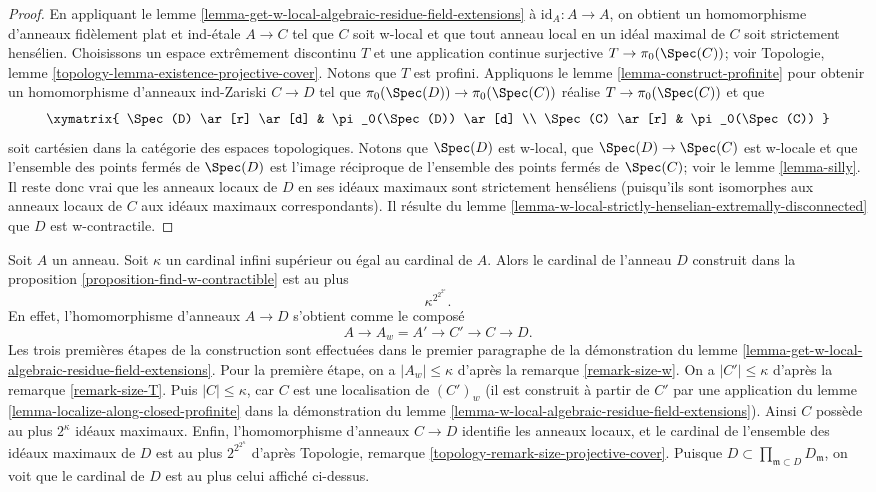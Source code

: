 \begin{proof}
En appliquant le lemme \ref{lemma-get-w-local-algebraic-residue-field-extensions}
à $\text{id}_A : A \to A$, on obtient un homomorphisme d'anneaux fidèlement plat et ind-\'etale
$A \to C$ tel que $C$ soit w-local et que tout anneau local en un
idéal maximal de $C$ soit strictement hensélien.
Choisissons un espace extrêmement discontinu $T$ et une application continue
surjective $T \to \pi_0(\Spec(C))$; voir
Topologie, lemme \ref{topology-lemma-existence-projective-cover}.
Notons que $T$ est profini. Appliquons le lemme \ref{lemma-construct-profinite}
pour obtenir un homomorphisme d'anneaux ind-Zariski $C \to D$ tel que
$\pi_0(\Spec(D)) \to \pi_0(\Spec(C))$ réalise $T \to \pi_0(\Spec(C))$
et que
$$
\xymatrix{
\Spec(D) \ar[r] \ar[d] & \pi_0(\Spec(D)) \ar[d] \\
\Spec(C) \ar[r] & \pi_0(\Spec(C))
}
$$
soit cartésien dans la catégorie des espaces topologiques. Notons que $\Spec(D)$
est w-local, que $\Spec(D) \to \Spec(C)$ est w-locale et que
l'ensemble des points fermés de $\Spec(D)$ est l'image réciproque de
l'ensemble des points fermés de $\Spec(C)$; voir le lemme \ref{lemma-silly}.
Il reste donc vrai que les anneaux locaux de $D$ en ses idéaux
maximaux sont strictement henséliens (puisqu'ils sont isomorphes aux
anneaux locaux de $C$ aux idéaux maximaux correspondants).
Il résulte du
lemme \ref{lemma-w-local-strictly-henselian-extremally-disconnected}
que $D$ est w-contractile.
\end{proof}

\begin{remark}
\label{remark-size-w-contractible}
Soit $A$ un anneau. Soit $\kappa$ un cardinal infini supérieur ou
égal au cardinal de $A$. Alors le cardinal de l'anneau
$D$ construit dans la proposition \ref{proposition-find-w-contractible}
est au plus
$$
\kappa^{2^{2^{2^\kappa}}}.
$$
En effet, l'homomorphisme d'anneaux $A \to D$
s'obtient comme le composé
$$
A \to A_w = A' \to C' \to C \to D.
$$
Les trois premières étapes de la construction sont effectuées
dans le premier paragraphe de la démonstration du
lemme \ref{lemma-get-w-local-algebraic-residue-field-extensions}.
Pour la première étape, on a $|A_w| \leq \kappa$ d'après la
remarque \ref{remark-size-w}.
On a $|C'| \leq \kappa$ d'après la
remarque \ref{remark-size-T}.
Puis $|C| \leq \kappa$, car $C$ est une localisation de $(C')_w$
(il est construit à partir de $C'$ par une application du
lemme \ref{lemma-localize-along-closed-profinite}
dans la démonstration du lemme \ref{lemma-w-local-algebraic-residue-field-extensions}).
Ainsi $C$ possède au plus $2^\kappa$ idéaux maximaux.
Enfin, l'homomorphisme d'anneaux $C \to D$ identifie les anneaux locaux, et le
cardinal de l'ensemble des idéaux maximaux de $D$ est au plus
$2^{2^{2^\kappa}}$ d'après
Topologie, remarque \ref{topology-remark-size-projective-cover}.
Puisque $D \subset \prod_{\mathfrak m \subset D} D_\mathfrak m$, on voit
que le cardinal de $D$ est au plus celui affiché ci-dessus.
\end{remark}

